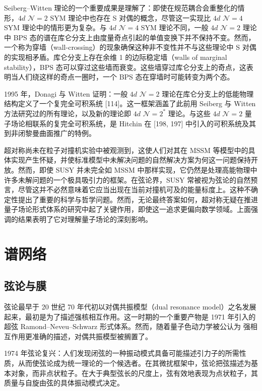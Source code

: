 
Seiberg--Witten 理论的一个重要成果是理解了：即使在规范耦合会重整化的情形，$4d$ $\mathcal{N}=2$ SYM 理论中也存在 S 对偶的概念，尽管这一实现比 $4d$ $\mathcal{N}=4$ SYM 理论中的情形更为复杂。与 $4d$ $\mathcal{N}=4$ SYM 理论不同，一般 $4d$ $\mathcal{N}=2$ 理论中 BPS 态的谱在库仑分支上由度量奇点引起的单值变换下并不保持不变。然而，一个称为穿墙（wall-crossing）的现象确保这种非不变性并不与这些理论中 S 对偶的实现相矛盾。库仑分支上存在余维 1 的边际稳定墙（walls of marginal stability），BPS 态可以穿过这些墙而衰变。这些墙穿过库仑分支上的奇点，这表明当人们绕这样的奇点一圈时，一个 BPS 态在穿墙时可能转变为两个态。

1995 年，Donagi 与 Witten 证明：一般 $4d$ $\mathcal{N}=2$ 理论在库仑分支上的低能物理结构定义了一个复完全可积系统 [114]。这一框架涵盖了此前用 Seiberg 与 Witten 方法研究过的所有理论，以及新的理论即 $4d$ $\mathcal{N}=2^*$ 理论。与这些 $4d$ $\mathcal{N}=2$ 量子场论相联系的复完全可积系统，是 Hitchin 在 [198, 197] 中引入的可积系统及其到非闭黎曼曲面推广的特例。

超对称尚未在粒子对撞机实验中被观测到，这使人们对其在 MSSM 等模型中的具体实现产生怀疑，并使标准模型中未解决问题的自然解决方案为何这一问题保持开放。然而，即使 SUSY 并未完全如 MSSM 中那样实现，它仍然是处理高能物理中许多未解问题的一个极具吸引力的框架。在弦论界，SUSY 常被视为弦论的自然预言，尽管这并不必然意味着它应当出现在当前对撞机可及的能量标度上。这种不确定性提出了重要的科学与哲学问题。然而，无论最终答案如何，超对称无疑在推进量子场论形式体系的研究中起了关键作用，即使这一追求更偏向数学领域。上面强调的结果表明了它对理解量子场论的深刻影响。

\section*{谱网络}

\subsection*{弦论与膜}

弦论最早于 20 世纪 70 年代初以对偶共振模型（dual resonance model）之名发展起来，最初是为了描述强核相互作用。这一时期的一个重要产物是 1971 年引入的超弦 Ramond--Neveu--Schwarz 形式体系。然而，随着量子色动力学被公认为
强相互作用更准确的描述，对偶共振模型被搁置了。

1974 年弦论复兴：人们发现闭弦的一种振动模式具备可能描述引力子的所需性质，从而使弦论成为统一理论的一个候选者。在其微扰框架中，弦论把弦描述为基本对象，而非点状粒子。在大于典型弦长的尺度上，弦有效地表现为点状粒子，其质量与自旋由弦的具体振动模式决定。

